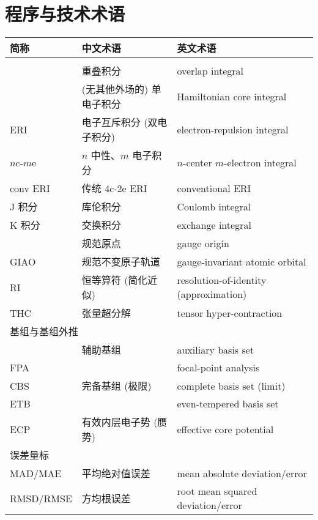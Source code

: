 \endgroup
    
\section*{程序与技术术语}

\begingroup
\setlength{\LTleft}{-20cm plus -1fill}
\setlength{\LTright}{\LTleft}

\begin{longtable}{lll}
    \toprule 简称 & 中文术语 & 英文术语 \\ \midrule \endhead
    \bottomrule \endlastfoot
    \multicolumn{3}{l}{\textsf{电子积分及其近似}} \\
    & 重叠积分 & overlap integral \\
    & (无其他外场的) 单电子积分 & Hamiltonian core integral \\
    ERI & 电子互斥积分 (双电子积分) & electron-repulsion integral \\
    $n$c-$m$e & $n$ 中性、$m$ 电子积分 & $n$-center $m$-electron integral \\
    conv ERI & 传统 4c-2e ERI & conventional ERI \\
    J 积分 & 库伦积分 & Coulomb integral \\
    K 积分 & 交换积分 & exchange integral \\
    & 规范原点 & gauge origin \\
    GIAO & 规范不变原子轨道 & gauge-invariant atomic orbital \\
    RI & 恒等算符 (简化近似) & resolution-of-identity (approximation) \\
    THC & 张量超分解 & tensor hyper-contraction \\
    \midrule
    \multicolumn{3}{l}{\textsf{基组与基组外推}} \\
    & 辅助基组 & auxiliary basis set \\
    FPA & & focal-point analysis \\
    CBS & 完备基组 (极限) & complete basis set (limit) \\
    ETB & & even-tempered basis set \\
    ECP & 有效内层电子势 (赝势) & effective core potential \\
    \midrule
    \multicolumn{3}{l}{\textsf{误差量标}} \\
    MAD/MAE & 平均绝对值误差 & mean absolute deviation/error \\
    RMSD/RMSE & 方均根误差 & root mean squared deviation/error \\ 

\end{longtable}
